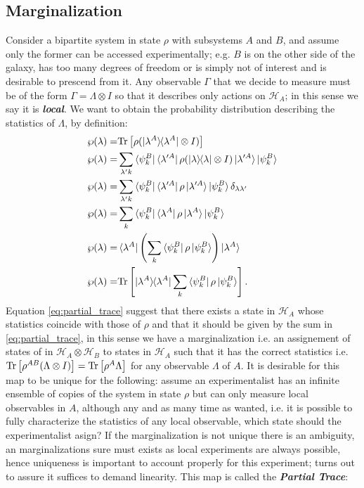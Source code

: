 \subsection{Marginalization}
Consider a bipartite system in state $\rho$ with subsystems $A$ and $B$, and assume only the former can be accessed
experimentally; e.g. $B$ is on the other side of the galaxy, has too many degrees of freedom or is simply not of interest and is desirable
to prescend from it. Any
observable $\Gamma$ that we decide to measure must be of the form $\Gamma=\Lambda \otimes I$ so that it describes only actions on
$\mathcal{H}_{A}$; in this sense we say it is \textit{\textbf{local}}. We want to obtain the probability distribution describing the statistics
of $\Lambda$, by definition:
\begin{align}
  \wp(\lambda)=&\Tr{\rho (\ketbra{\lambda^{A}}\otimes I)}\\
  \wp(\lambda)=& \sum_{\lambda'k}\bra{\psi_{k}^{B}}\bra{\lambda'^{A}}\rho (\ketbra{\lambda}\otimes I)\ket{\lambda'^{A}}\ket{\psi_{k}^{B}}\\
  \wp(\lambda)=& \sum_{\lambda'k}\bra{\psi_{k}^{B}}\bra{\lambda'^{A}}\rho \ket{\lambda'^{A}}\ket{\psi_{k}^{B}} \delta_{\lambda\lambda'}\\
  \wp(\lambda)=& \sum_{k}\bra{\psi_{k}^{B}}\bra{\lambda^{A}}\rho \ket{\lambda^{A}}\ket{\psi_{k}^{B}} \\
  \wp(\lambda)=&\bra{\lambda^{A}} \left(\sum_{k}\bra{\psi_{k}^{B}}\rho\ket{\psi_{k}^{B}}\right)\ket{\lambda^{A}}\\
  \wp(\lambda)=& \Tr{\ketbra{\lambda^{A}}\sum_{k}\bra{\psi_{k}^{B}}\rho\ket{\psi_{k}^{B}}} \label{eq:partial_trace}.
\end{align}
Equation \eqref{eq:partial_trace} suggest that there exists a state in $\mathcal{H}_{A}$ whose statistics  coincide
with those of $\rho$ and that it should be given by the sum in \eqref{eq:partial_trace}, in this sense we have a marginalization i.e.
an assignement of states of in $\mathcal{H}_{A}\otimes\mathcal{H}_{B}$ to states in $\mathcal{H}_{A}$ such that it has the correct statistics
i.e. $\mathrm{Tr}\left[\rho^{AB}(\Lambda \otimes I)\right]=\mathrm{Tr}\left[\rho^{A}\Lambda\right]$ for any observable $\Lambda$ of $A$. It is desirable for this map to be unique
for the following: assume an experimentalist has an infinite ensemble of copies of the system in state $\rho$ but can only measure local
observables in $A$, although any and as many time as wanted, i.e. it is possible to fully characterize the statistics of any local observable,
which state should the experimentalist asign? If the marginalization is not unique there is an ambiguity, an marginalizations sure must
exists as local experiments are always possible, hence uniqueness is important to account properly for this experiment; turns out to
assure it suffices to demand linearity. This map is called the \textit{\textbf{Partial Trace}}:

